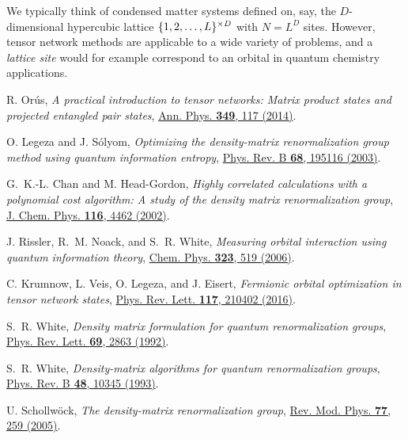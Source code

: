 \documentclass[english,11pt,aps,pra,onecolumn,tightenlines,groupedaddress,superscriptaddress,notitlepage,floatfix,fleqn]{revtex4-1}
\begin{document}
\begin{thebibliography}{10}

We typically think of condensed matter systems defined on, say, the
  $D$-dimensional hypercubic lattice $\protect \{1,2,\protect \dotsc ,L\protect
  \}^{\times D}$ with $N=L^D$ sites. However, tensor network methods are
  applicable to a wide variety of problems, and a \protect \emph {lattice site}
  would for example correspond to an orbital in quantum chemistry applications.

R. Or\'{u}s, {\em A practical introduction to tensor networks: Matrix product
  states and projected entangled pair states},
  \href{https://doi.org/10.1016/j.aop.2014.06.013} {Ann. Phys. {\bf 349},  117
   (2014)}.

O. Legeza and J. S\'olyom, {\em Optimizing the density-matrix renormalization
  group method using quantum information entropy},
  \href{https://doi.org/10.1103/PhysRevB.68.195116} {Phys. Rev. B {\bf 68},
  195116  (2003)}.

G.~K.-L. Chan and M. Head-Gordon, {\em Highly correlated calculations with a
  polynomial cost algorithm: A study of the density matrix renormalization
  group}, \href{https://doi.org/10.1063/1.1449459} {J. Chem. Phys. {\bf 116},
  4462  (2002)}.

J. Rissler, R.~M. Noack, and S.~R. White, {\em Measuring orbital interaction
  using quantum information theory},
  \href{https://doi.org/10.1016/j.chemphys.2005.10.018} {Chem. Phys. {\bf 323},
   519  (2006)}.

C. Krumnow, L. Veis, O. Legeza, and J. Eisert, {\em Fermionic orbital
  optimization in tensor network states},
  \href{https://doi.org/10.1103/PhysRevLett.117.210402} {Phys. Rev. Lett. {\bf
  117},  210402  (2016)}.

S.~R. White, {\em Density matrix formulation for quantum renormalization
  groups}, \href{https://doi.org/10.1103/PhysRevLett.69.2863} {Phys. Rev. Lett.
  {\bf 69},  2863  (1992)}.

S.~R. White, {\em Density-matrix algorithms for quantum renormalization
  groups}, \href{https://doi.org/10.1103/PhysRevB.48.10345} {Phys. Rev. B {\bf
  48},  10345  (1993)}.

U. Schollw\"{o}ck, {\em The density-matrix renormalization group},
  \href{https://doi.org/10.1103/RevModPhys.77.259} {Rev. Mod. Phys. {\bf 77},
  259  (2005)}.


\end{thebibliography}
\end{document}
